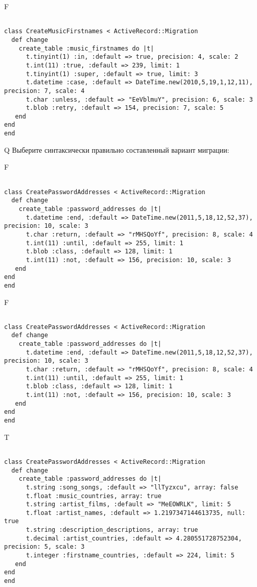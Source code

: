 F
\begin{verbatim}
		
class CreateMusicFirstnames < ActiveRecord::Migration 
  def change 
    create_table :music_firstnames do |t| 
      t.tinyint(1) :in, :default => true, precision: 4, scale: 2
      t.int(11) :true, :default => 239, limit: 1
      t.tinyint(1) :super, :default => true, limit: 3
      t.datetime :case, :default => DateTime.new(2010,5,19,1,12,11), precision: 7, scale: 4
      t.char :unless, :default => "EeVblmuY", precision: 6, scale: 3
      t.blob :retry, :default => 154, precision: 7, scale: 5
   end
end
end
\end{verbatim}

Q
Выберите синтаксически правильно составленный вариант миграции:

F
\begin{verbatim}
		
class CreatePasswordAddresses < ActiveRecord::Migration 
  def change 
    create_table :password_addresses do |t| 
      t.datetime :end, :default => DateTime.new(2011,5,18,12,52,37), precision: 10, scale: 3
      t.char :return, :default => "rMHSQoYf", precision: 8, scale: 4
      t.int(11) :until, :default => 255, limit: 1
      t.blob :class, :default => 128, limit: 1
      t.int(11) :not, :default => 156, precision: 10, scale: 3
   end
end
end
\end{verbatim}

F
\begin{verbatim}
		
class CreatePasswordAddresses < ActiveRecord::Migration 
  def change 
    create_table :password_addresses do |t| 
      t.datetime :end, :default => DateTime.new(2011,5,18,12,52,37), precision: 10, scale: 3
      t.char :return, :default => "rMHSQoYf", precision: 8, scale: 4
      t.int(11) :until, :default => 255, limit: 1
      t.blob :class, :default => 128, limit: 1
      t.int(11) :not, :default => 156, precision: 10, scale: 3
   end
end
end
\end{verbatim}

T
\begin{verbatim}
		
class CreatePasswordAddresses < ActiveRecord::Migration 
  def change 
    create_table :password_addresses do |t| 
      t.string :song_songs, :default => "llTyzxcu", array: false
      t.float :music_countries, array: true
      t.string :artist_films, :default => "MeEOWRLK", limit: 5
      t.float :artist_names, :default => 1.2197347144613735, null: true
      t.string :description_descriptions, array: true
      t.decimal :artist_countries, :default => 4.280551728752304, precision: 5, scale: 3
      t.integer :firstname_countries, :default => 224, limit: 5
   end
end
end
\end{verbatim}

